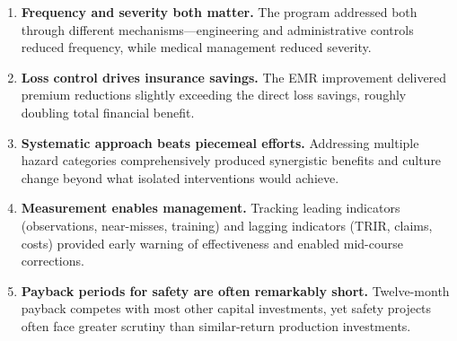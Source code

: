 \documentclass[11pt,openany]{book}
\providecommand{\tightlist}{\setlength{\itemsep}{0pt}\setlength{\parskip}{0pt}}
\begin{document}
\begin{enumerate}\tightlist
  \item \textbf{Frequency and severity both matter.} The program addressed
        both through different mechanisms---engineering and administrative
        controls reduced frequency, while medical management reduced severity.
  \item \textbf{Loss control drives insurance savings.} The EMR improvement
        delivered premium reductions slightly exceeding the direct loss
        savings, roughly doubling total financial benefit.
  \item \textbf{Systematic approach beats piecemeal efforts.} Addressing
        multiple hazard categories comprehensively produced synergistic
        benefits and culture change beyond what isolated interventions would
        achieve.
  \item \textbf{Measurement enables management.} Tracking leading indicators
        (observations, near-misses, training) and lagging indicators (TRIR,
        claims, costs) provided early warning of effectiveness and enabled
        mid-course corrections.
  \item \textbf{Payback periods for safety are often remarkably short.}
        Twelve-month payback competes with most other capital investments, yet
        safety projects often face greater scrutiny than similar-return
        production investments.
\end{enumerate}
\end{document}
